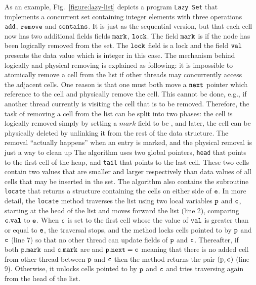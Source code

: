 As an example, Fig.~\ref{figure:lazy-list} depicts a program
{\tt Lazy Set} \cite{Lazyset}
that implements a concurrent set containing integer
elements with three operations $\tt add$, $\tt remove$ and $\tt contains$.
It is just as the sequential version,
but that each cell now has two additional fields fields ${\tt mark}$, ${\tt lock}$. The field $\tt mark$ is \true\; if
the node has been logically removed from the set. The ${\tt lock}$ field is a lock and the field ${\tt val}$ presents the data value which is integer in this case. The
mechanism behind logically and physical removing is explained as following: it is impossible to atomically remove a cell from the list if other threads may concurrently access the adjacent cells. One reason is that one must both move a $\tt next$ pointer which reference to the cell and physically remove the cell. This cannot be done, e.g., if another thread currently is visiting the cell that is to be removed. Therefore, the task of removing a cell from the list  can be split into two phases: the cell is logically removed simply by setting a $mark$ field to be \true, and later, the cell can be physically deleted by unlinking it from the rest of the data structure. The removal “actually happens” when an entry is marked, and the physical removal is just a way to clean up
The algorithm uses two global pointers, {\tt head} that points to  the first cell of the heap, and {\tt tail} that points to the last cell.  
These two cells contain two values that are smaller 
and larger respectively than data values of all cells that may be                     
inserted in the set. The algorithm also contains the subroutine {\tt locate} that returns a structure containing the cells on either side of $\tt e$. In more detail, the {\tt locate} method traverses the list using two local variables ${\tt p}$ and $\tt c$, starting at the head of the list and moves forward the list (line 2), comparing ${\tt c.val}$ to ${\tt e}$. When $\tt c$ is set to the
first cell whose the value of  $\tt val$ is greater than or equal to $\tt e$, the traversal stops, and the
method locks cells pointed to by $\tt p$ and $\tt c$ (line 7) so that no other thread can update fields of $\tt p$ and $\tt c$. Thereafter, if both $\tt p.mark$ and $\tt c.mark$ are \false \; and ${\tt p.next = c}$ meaning that there is no added cell from other thread between $\tt p$ and $\tt c$ then the method returns the pair $\tt (p,c)$ (line 9). Otherwise, it unlocks cells pointed to by $\tt p$ and $\tt c$ and tries traversing again from the head of the list.



